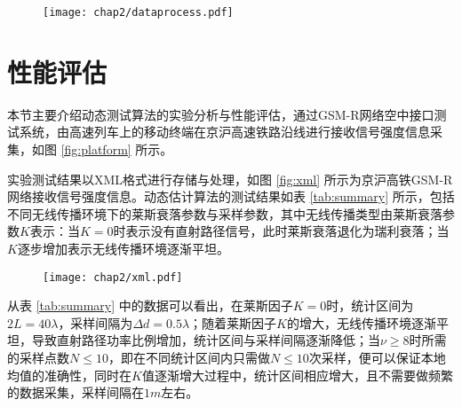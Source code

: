 \begin{figure}[!htp]
\centering
    \texttt{[image: chap2/dataprocess.pdf]}
\end{figure}


\section{性能评估}
\label{chap:evaluation_phy}

本节主要介绍动态测试算法的实验分析与性能评估，通过GSM-R网络空中接口测试系统，由高速列车上的移动终端在京沪高速铁路沿线进行接收信号强度信息采集，如图 \ref{fig:platform} 所示。

\begin{figure}[!htp]
\centering
{}
    \hspace{1cm}
\end{figure}

实验测试结果以XML格式进行存储与处理，如图 \ref{fig:xml} 所示为京沪高铁GSM-R网络接收信号强度信息。动态估计算法的测试结果如表 \ref{tab:summary} 所示，包括不同无线传播环境下的莱斯衰落参数与采样参数，其中无线传播类型由莱斯衰落参数$K$表示：当$K=0$时表示没有直射路径信号，此时莱斯衰落退化为瑞利衰落；当$K$逐步增加表示无线传播环境逐渐平坦。

\begin{figure}[!htp]
\centering
\texttt{[image: chap2/xml.pdf]}
\end{figure}

从表 \ref{tab:summary} 中的数据可以看出，在莱斯因子$K = 0$时，统计区间为$2L = 40\lambda$，采样间隔为$\Delta d = 0.5\lambda$；随着莱斯因子$K$的增大，无线传播环境逐渐平坦，导致直射路径功率比例增加，统计区间与采样间隔逐渐降低；当$\nu \geq 8$时所需的采样点数$N \leq 10$，即在不同统计区间内只需做$N \leq 10$次采样，便可以保证本地均值的准确性，同时在$K$值逐渐增大过程中，统计区间相应增大，且不需要做频繁的数据采集，采样间隔在$1m$左右。

